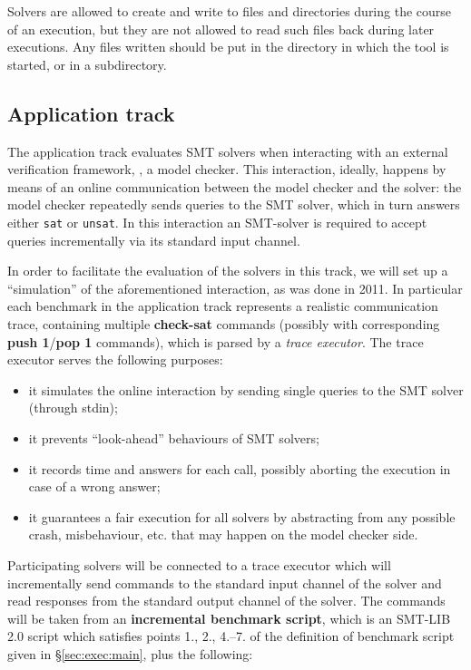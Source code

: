 \documentclass[12pt]{article}
\newcommand{\akey}[1]{\textbf{#1}}
\begin{document}
Solvers are allowed to create and write to
files and directories during the course of an execution, but they are
not allowed to read such files back during later executions.  Any
files written should be put in the directory in which the tool is
started, or in a subdirectory.

\subsection{Application track}
\label{sec:exec:application}

The application track evaluates SMT solvers when interacting
with an external verification framework, \eg, a model
checker. This interaction, ideally, happens by means of an online
communication between the model checker and the solver: the model
checker repeatedly sends queries to the SMT solver, which in turn
answers either \texttt{sat} or \texttt{unsat}.  In this interaction an SMT-solver is
required to accept queries incrementally via its standard input channel.

In order to facilitate the evaluation of the solvers in this track, we
will set up a ``simulation'' of the aforementioned interaction, as was done in 2011. In
particular each benchmark in the application track represents a realistic
communication trace, containing multiple \akey{check-sat} commands (possibly
with corresponding \akey{push 1}/\akey{pop 1} commands), which
is parsed by a {\em trace executor}. The trace executor serves the following purposes:
\begin{itemize}
\item it simulates the online interaction by sending single queries to the SMT solver
      (through stdin);
\item it prevents ``look-ahead'' behaviours of SMT solvers;
\item it records time and answers for each call, possibly aborting the execution
      in case of a wrong answer;
\item it guarantees a fair execution for all solvers by abstracting from any possible
      crash, misbehaviour, etc. that may happen on the model checker side.
\end{itemize}

Participating solvers will be connected to a trace executor 
which will incrementally send commands to the standard input channel of the solver
and read responses from the standard output channel of the solver.
The commands will be taken from an \textbf{incremental benchmark script},
which is an SMT-LIB 2.0 script which satisfies points 1., 2., 4.--7. of the definition of benchmark script given in \S\ref{sec:exec:main}, plus the following:
\end{document}
